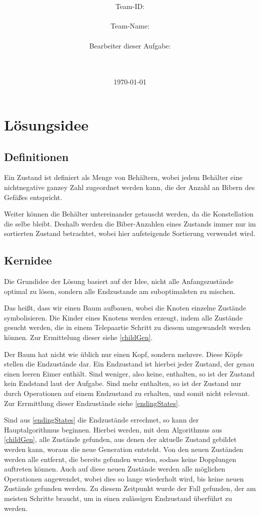 \documentclass[a4paper,10pt,ngerman]{scrartcl}
\title{\textbf{\Huge\Aufgabe}}
\author{\LARGE Team-ID: \LARGE \TeamID \\\\
	    \LARGE Team-Name: \LARGE \TeamName \\\\
	    \LARGE Bearbeiter dieser Aufgabe: \\ 
	    \LARGE \Namen\\\\}
\date{\LARGE\today}
\begin{document}
\maketitle
\tableofcontents

\vspace{0.5cm}

\section{Lösungsidee}

\subsection{Definitionen}

Ein Zustand ist definiert als Menge von Behältern, wobei jedem Behälter eine nichtnegative ganzey Zahl zugeordnet werden kann, die der Anzahl an Bibern des Gefäßes entspricht.

Weiter können die Behälter untereinander getauscht werden, da die Konstellation die selbe bleibt. Deshalb werden die Biber-Anzahlen eines Zustands immer nur im sortierten Zustand betrachtet, wobei hier aufsteigende Sortierung verwendet wird.

\subsection{Kernidee}

Die Grundidee der Lösung basiert auf der Idee, nicht alle Anfangszustände optimal zu lösen, sondern alle Endzustande am suboptimalsten zu mischen.

Das heißt, dass wir einen Baum  aufbauen, wobei die Knoten einzelne Zustände symbolisieren.
Die Kinder eines Knotens werden erzeugt, indem alle Zustände gesucht werden, die in einem Telepaartie Schritt zu diesem umgewandelt werden können. Zur Ermittelung dieser siehe \cref{childGen}.

Der Baum hat nicht wie üblich nur einen Kopf, sondern mehrere. Diese Köpfe stellen die Endzustände dar. Ein Endzustand ist hierbei jeder Zustand, der genau einen leeren Eimer enthält. Sind weniger, also keine, enthalten, so ist der Zustand kein Endstand laut der Aufgabe. Sind mehr enthalten, so ist der Zustand nur durch Operationen auf einem Endzustand zu erhalten, und somit nicht relevant. Zur Errmittlung dieser Endzustände siehe \cref{endingStates}.

Sind aus \cref{endingStates} die Endzustände errechnet, so kann der Hauptalgorithmus beginnen.
Hierbei werden, mit dem Algorithmus aus \cref{childGen},  alle Zustände gefunden, aus denen der aktuelle Zustand gebildet werden kann, woraus die neue Generation entsteht.
Von den neuen Zuständen werden alle entfernt, die bereits gefunden wurden, sodass keine Dopplungen auftreten können. Auch auf diese neuen Zustände werden alle möglichen Operationen angewendet, wobei dies so lange wiederholt wird, bis keine neuen Zustände gefunden werden. Zu diesem Zeitpunkt wurde der Fall gefunden, der am meisten Schritte braucht, um in einen zulässigen Endzustand überführt zu werden.
\end{document}
